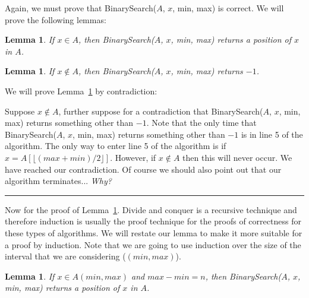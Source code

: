 \documentclass[twoside]{article}
\newtheorem{lemma}[theorem]{Lemma}
\newenvironment{proof}{{\bf Proof:}}{\hfill\rule{2mm}{2mm}}
\begin{document}
Again, we must prove that {\sc BinarySearch($A$, $x$, min, max)} is correct.
We will prove the following lemmas:
\begin{lemma}\label{proof:binary_search_firsttry}
  If $x\in A$, then {\sc BinarySearch($A$, $x$, min, max)} returns a
  position of $x$ in $A$.
\end{lemma}

\begin{lemma}\label{proof:binary_search_not_in}
  If $x\notin A$, then {\sc BinarySearch($A$, $x$, min, max)} returns $-1$.
\end{lemma}

We will prove Lemma~\ref{proof:binary_search_not_in} by contradiction:

\begin{proof}
  Suppose $x\notin A$, further suppose for a contradiction that {\sc BinarySearch($A$,
    $x$, min, max)} returns something other than $-1$. Note that the
  only time that {\sc BinarySearch($A$,
    $x$, min, max)} returns something other than $-1$ is in line 5 of
  the algorithm. The only way to enter line 5 of the algorithm is if
  $x = A[\lfloor (max + min)/2\rfloor]$. However, if $x\notin A$ then
  this will never occur. We have reached our contradiction. Of course
  we should also point out that our algorithm terminates... {\em Why?}
\end{proof}

Now for the proof of Lemma~\ref{proof:binary_search_firsttry}. Divide
and conquer is a recursive technique and therefore induction is
usually the proof technique for the proofs of correctness for these
types of algorithms. We will restate our lemma to make it more
suitable for a proof by induction. Note that we are going to use
induction over the size of the interval that we are considering
($(min,max)$).

\begin{lemma}
  If $x\in A(min,max)$ and $max - min = n$, then {\sc
    BinarySearch($A$, $x$, min, max)} returns a position of $x$ in
  $A$.
\end{lemma}
\end{document}
